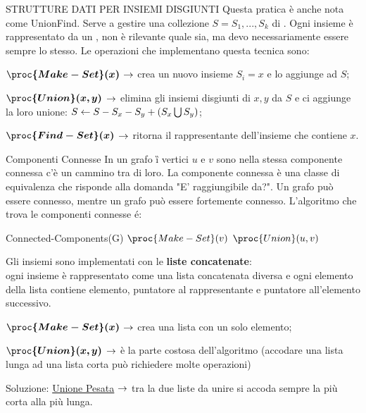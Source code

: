 \documentclass[8pt]{extarticle}
\begin{document}
\begin{formulario}
		\begin{myParagraph}{STRUTTURE DATI PER INSIEMI DISGIUNTI}
Questa pratica è anche nota come UnionFind. Serve a gestire una collezione $S={S_1,...,S_k}$ di . Ogni insieme è rappresentato da un , non è rilevante quale sia, ma devo necessariamente essere sempre lo stesso. Le operazioni che implementano questa tecnica sono:
			\begin{Descr} 
		\item[$\bm{\proc{Make-Set}(x)}$] $\rightarrow$ crea un nuovo insieme $S_i={x}$ e lo aggiunge ad $S$;
		\item[$\bm{\proc{Union}(x,y)}$] $\rightarrow$ elimina gli insiemi disgiunti di $x,y$ da $S$ e ci aggiunge la loro unione: $S\leftarrow S-S_x-S_y+(S_x\bigcup S_y)$;
		\item[$\bm{\proc{Find-Set}(x)}$] $\rightarrow$ ritorna il rappresentante dell'insieme che contiene $x$.
			\end{Descr}
			\begin{subParagraph}{Componenti Connesse}
In un grafo \G i vertici $u$ e $v$ sono nella stessa componente connessa \SSE c'è un cammino tra di loro. La componente connessa è una classe di equivalenza che risponde alla domanda "E' raggiungibile da?". Un grafo  può essere connesso, mentre un grafo  può essere fortemente connesso. L'algoritmo che trova le componenti connesse é:
				\begin{code}{Connected-Components(G)}
\li {}
	\li $\proc{Make-Set}(v)$
\END
\li {}
	\li {}
		\li $\proc{Union}(u,v)$
	\END
\END
				\end{code}
Gli insiemi sono implementati con le \textbf{liste concatenate}:\\
ogni insieme è rappresentato come una lista concatenata diversa e ogni elemento della lista contiene elemento, puntatore al rappresentante e puntatore all'elemento successivo.
\begin{descr}{1}
		\item[$\bm{\proc{Make-Set}(x)}$] $\rightarrow$ crea una lista con un solo elemento;
		\item[$\bm{\proc{Union}(x,y)}$] $\rightarrow$ è la parte costosa dell'algoritmo (accodare una lista lunga ad una lista corta può richiedere molte operazioni)
		\begin{Descr} 
			\item[Soluzione:] \underline{Unione Pesata} $\rightarrow$ tra la due liste da unire si accoda sempre la più corta alla più lunga.

\end{Descr}
\end{descr}
\end{subParagraph}
\end{myParagraph}
\end{formulario}
\end{document}
